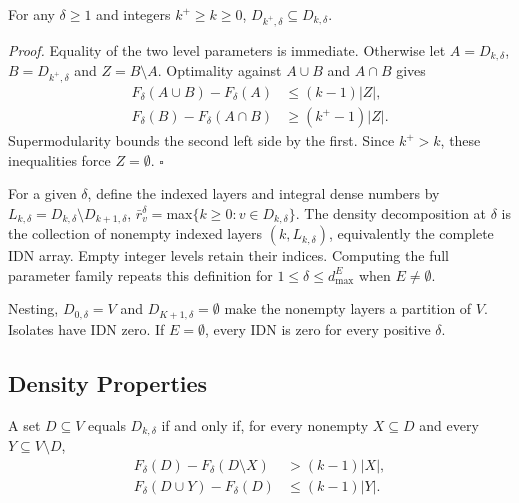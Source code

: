 \documentclass[twocolumn]{svjour3}
\begin{document}
\begin{theorem}\label{hierarchical}
For any $\delta\ge1$ and integers $k^+\ge k\ge0$, $D_{k^+,\delta}\subseteq D_{k,\delta}$.
\end{theorem}
\emph{Proof.} Equality of the two level parameters is immediate. Otherwise let $A=D_{k,\delta}$, $B=D_{k^+,\delta}$ and $Z=B\setminus A$. Optimality against $A\cup B$ and $A\cap B$ gives
\begin{align*}
 F_\delta(A\cup B)-F_\delta(A)&\le(k-1)|Z|,\\
 F_\delta(B)-F_\delta(A\cap B)&\ge(k^+-1)|Z|.
\end{align*}
Supermodularity bounds the second left side by the first. Since $k^+>k$, these inequalities force $Z=\emptyset$. \hfill$\square$

\begin{definition}\label{def:decomposition}
For a given $\delta$, define the indexed layers and integral dense numbers by
$L_{k,\delta}=D_{k,\delta}\setminus D_{k+1,\delta}$,
 $\bar r_v^\delta=$max$\{k\ge0:v\in D_{k,\delta}\}$.
The density decomposition at $\delta$ is the collection of nonempty indexed layers $(k,L_{k,\delta})$, equivalently the complete IDN array. Empty integer levels retain their indices. Computing the full parameter family repeats this definition for $1\le\delta\le d^E_{\max}$ when $E\ne\emptyset$.
\end{definition}
Nesting, $D_{0,\delta}=V$ and $D_{K+1,\delta}=\emptyset$ make the nonempty layers a partition of $V$. Isolates have IDN zero. If $E=\emptyset$, every IDN is zero for every positive $\delta$.

\subsection{Density Properties}

\begin{theorem}
\label{in-outsidedense}
A set $D\subseteq V$ equals $D_{k,\delta}$ if and only if,
for every nonempty $X\subseteq D$ and every
$Y\subseteq V\setminus D$,
\begin{align*}
F_\delta(D)-F_\delta(D\setminus X)&>(k-1)|X|,\\
F_\delta(D\cup Y)-F_\delta(D)&\le(k-1)|Y|.
\end{align*}
\end{theorem}
\end{document}
